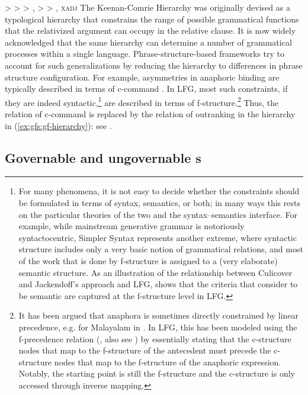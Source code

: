 \documentclass[output=paper]{../langscibook}
\begin{document}
 \ea\label{ex:gfs:gf-hierarchy}
 \SUBJ > \OBJ > {\OBJTHETA} > \COMP, \XCOMP > {\OBLTHETA} > \ADJ, \textsc{xadj}
 \z
 The Keenan-Comrie Hierarchy was originally devised as a typological hierarchy that constrains the range of possible grammatical functions that the relativized argument can occupy in the relative clause. It is now widely acknowledged that the same hierarchy can determine a number of grammatical processes within a single language. Phrase-structure-based frameworks try to account for such generalizations by reducing the hierarchy to differences in phrase structure configuration. For example, asymmetries in anaphoric binding are typically described in terms of c-command \citep{chomsky1982some}. In LFG, most such constraints, if they are indeed syntactic,\footnote{For many phenomena, it is not easy to decide whether the constraints should be formulated in terms of syntax, semantics, or both; in many ways this rests on the particular theories of the two and the syntax--semantics interface. For example, while mainstream generative grammar is notoriously syntactocentric, Simpler Syntax represents another extreme, where syntactic structure includes only a very basic notion of grammatical relations, and most of the work that is done by f-structure is assigned to a (very elaborate) semantic structure. As an illustration of the relationship between Culicover and Jackendoff's approach and LFG, \citet{belyaev2015} shows that the criteria that \citet{culicover-jackendoff1997} consider to be semantic are captured at the f-structure level in LFG.} are described in terms of f-structure.\footnote{It has been argued that anaphora is sometimes directly constrained by linear precedence, e.g. for Malayalam in \citet{mohanan1982}. In LFG, this has been modeled using the f-precedence relation (\cite{kaplan-zaenen1989-fprec}, also see ) by essentially stating that the c-structure nodes that map to the f-structure of the antecedent must precede the c-structure nodes that map to the f-structure of the anaphoric expression. Notably, the starting point is still the f-structure and the c-structure is only accessed through inverse mapping.} Thus, the relation of c-command is replaced by the relation of outranking in the hierarchy in (\ref{ex:gfs:gf-hierarchy}): see .
 
 \subsection{Governable and ungovernable {\GF}s\label{sect:gfs:govern}}
 
\end{document}
